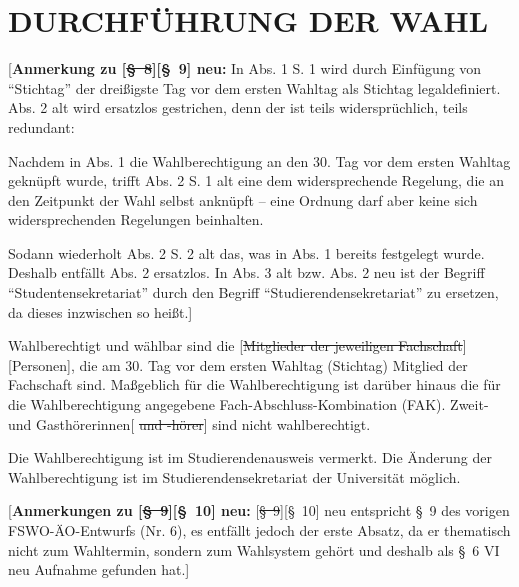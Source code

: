 \documentclass[%
draft,%
multilinesections%
]{fswo}
\newcommand\oldT[1]  {{\color{Gray}[\st{#1}]}}
\newcommand\newT[1]  {{\color{Green}[#1]}}
\newcommand\bemFr[1] {{\color{Red}[#1]}}
\newcommand\oldT[1]{}%
\newcommand\newT[1]{#1}
\newcommand\bemFr[1]{}%
\newcommand\change[2]{\oldT{#1}\newT{#2}}
\begin{document}
\section{DURCHFÜHRUNG DER WAHL}

\bemFr{\textbf{Anmerkung zu \change{\S~8}{\S~9} neu:} %
In Abs. 1 S. 1 wird durch Einfügung von \enquote{Stichtag} der dreißigste Tag vor dem ersten Wahltag als Stichtag legaldefiniert. Abs. 2 alt wird ersatzlos gestrichen, denn der ist teils widersprüchlich, teils redundant:

Nachdem in Abs. 1 die Wahlberechtigung an den 30. Tag vor dem ersten Wahltag geknüpft wurde, trifft Abs. 2 S. 1 alt eine dem widersprechende Regelung, die an den Zeitpunkt der Wahl selbst anknüpft -- eine Ordnung darf aber keine sich widersprechenden Regelungen beinhalten.

Sodann wiederholt Abs. 2 S. 2 alt das, was in Abs. 1 bereits festgelegt wurde.
Deshalb entfällt Abs. 2 ersatzlos. In Abs. 3 alt bzw. Abs. 2 neu ist der Begriff \enquote{Studentensekretariat} durch den Begriff \enquote{Studierendensekretariat} zu ersetzen, da dieses inzwischen so heißt.}


\begin{contract}
Wahlberechtigt und wählbar sind die \change{Mitglieder der jeweiligen Fachschaft}{Personen}, die am 30. Tag vor dem ersten Wahltag (Stichtag) Mitglied der Fachschaft sind.
Maßgeblich für die Wahlberechtigung ist darüber hinaus die für die Wahlberechtigung angegebene Fach-Abschluss-Kombination (FAK).
Zweit- und Gasthörerinnen\oldT{ und -hörer} sind nicht wahlberechtigt.

Die Wahlberechtigung ist im Studierendenausweis vermerkt.
Die Änderung der Wahlberechtigung ist im Studierendensekretariat der Universität möglich.
\end{contract}

\bemFr{\textbf{Anmerkungen zu \change{\S~9}{\S~10} neu:}
\change{\S~9}{\S~10} neu entspricht \S~9 des vorigen FSWO-ÄO-Entwurfs (Nr. 6), es entfällt jedoch der erste Absatz, da er thematisch nicht zum Wahltermin, sondern zum Wahlsystem gehört
und deshalb als \S~6 VI neu Aufnahme gefunden hat.}
\end{document}

